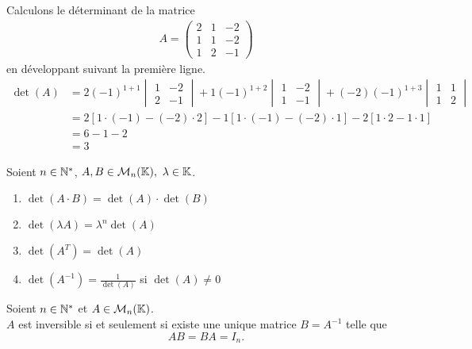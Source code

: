 \begin{example}
	Calculons le déterminant de la matrice 
	\begin{align*}
		A = 
		\begin{pmatrix}
		2 & 1 & -2 \\
		1 & 1 & -2 \\
		1 & 2 & -1
		\end{pmatrix}
	\end{align*}
	en développant suivant la première ligne.
	\begin{align*}
		\det(A) &= 2 (-1)^{1+1} 
		\begin{vmatrix}
			1 & -2 \\
			2 & -1	
		\end{vmatrix}			
		+ 1 (-1)^{1 + 2}
		\begin{vmatrix}
			1 & -2 \\
			1 & -1
		\end{vmatrix}
		+ (-2) (-1)^{1 + 3}
		\begin{vmatrix}
			1 & 1 \\
			1 & 2
		\end{vmatrix}
		\\
		&=
		2[1 \cdot (-1) - (-2) \cdot 2] -1[1 \cdot (-1) - (-2) \cdot 1] -2 [1 \cdot 2 - 1 \cdot 1]
		\\
		&= 6 - 1 - 2 \\
		&= 3
	\end{align*}
\end{example}

\begin{proposition}
	Soient $n \in \mathbb{N}^*$, $A, B \in \mathcal{M}_n(\mathbb{K}),\ \lambda \in \mathbb{K}$.
	\begin{multicols}{2}
	    \begin{enumerate}
		\item $\det(A \cdot B) = \det(A) \cdot \det(B)$
		\item $\det(\lambda A) = \lambda^n \det(A)$
		\item $\det(A^T) = \det(A)$
		\item $\det(A^{-1}) = \frac{1}{\det(A)}$ si $\det(A) \neq 0$
	\end{enumerate}
	\end{multicols}
\end{proposition}

\begin{definition}
	Soient $n \in \mathbb{N}^*$ et $A \in \mathcal{M}_n(\mathbb{K})$.
	\\
	$A$ est inversible si et seulement si existe une unique matrice $B = A^{-1}$ telle que 
	\[AB = BA = I_n.\]
\end{definition}

